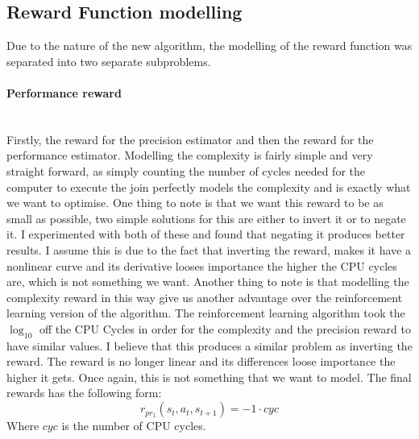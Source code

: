 \subsection{Reward Function modelling}
Due to the nature of the new algorithm, the modelling of the reward function was separated into two separate subproblems.
\paragraph{Performance reward}\mbox{}\\
Firstly, the reward for the precision estimator and then the reward for the performance estimator. Modelling the complexity is fairly simple and very straight forward, as simply counting the number of cycles needed for the computer to execute the join perfectly models the complexity and is exactly what we want to optimise. One thing to note is that we want this reward to be as small as possible, two simple solutions for this are either to invert it or to negate it. I experimented with both of these and found that negating it produces better results. I assume this is due to the fact that inverting the reward, makes it have a nonlinear curve and its derivative looses importance the higher the CPU cycles are, which is not something we want. Another thing to note is that modelling the complexity reward in this way give us another advantage over the reinforcement learning version of the algorithm. The reinforcement learning algorithm took the $\log_{10}$ off the CPU Cycles in order for the complexity and the precision reward to have similar values. I believe that this produces a similar problem as inverting the reward. The reward is no longer linear and its differences loose importance the higher it gets. Once again, this is not something that we want to model. The final rewards has the following form:
\begin{equation}
	r_{pr_1}(s_t,a_t,s_{t+1}) = -1 \cdot cyc
\end{equation}
Where $cyc$ is the number of CPU cycles.

